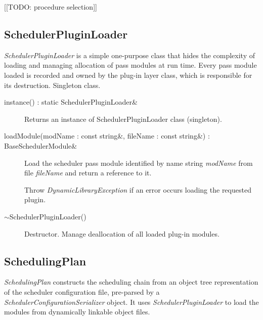\documentclass[a4paper,twoside]{tce}
\begin{document}
[[TODO: procedure selection]]

\subsection{SchedulerPluginLoader}
\label{ssec:SchedulerPluginLoader-if}

\emph{SchedulerPluginLoader} is a simple one-purpose class that hides the
complexity of loading and managing allocation of pass modules at run time.
%
Every pass module loaded is recorded and owned by the plug-in layer class,
which is responsible for its destruction. Singleton class.

\begin{description}
\item[instance() : static SchedulerPluginLoader\&]%
  Returns an instance of SchedulerPluginLoader class (singleton).

\item[loadModule(modName : const string\&, fileName : const string\&) :
  BaseSchedulerModule\&]%
  Load the scheduler pass module identified by name string \emph{modName}
  from file \emph{fileName} and return a reference to it.

  Throw \emph{DynamicLibraryException} if an error occurs loading the
  requested plugin.

\item[$\sim$SchedulerPluginLoader()]%
  Destructor. Manage deallocation of all loaded plug-in modules.
\end{description}

\subsection{SchedulingPlan}
\label{ssec:SchedulingPlan-if}

\emph{SchedulingPlan} constructs the scheduling chain
from an object tree representation of the scheduler configuration
file, pre-parsed by a \emph{SchedulerConfigurationSerializer}
object. It uses \emph{SchedulerPluginLoader} to load the modules from
dynamically linkable object files.
\end{document}
